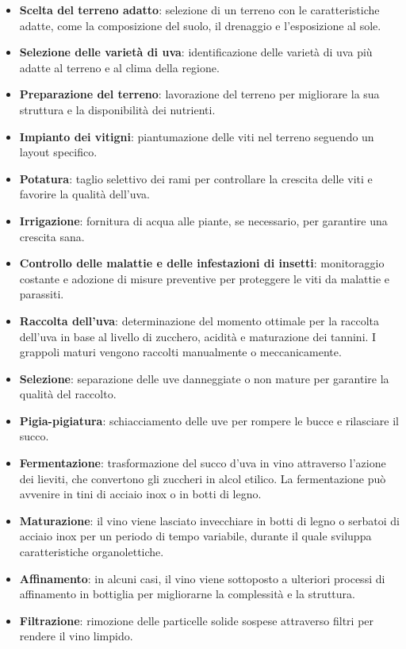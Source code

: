 \documentclass[12pt, a4paper]{article}
\begin{document}
\begin{itemize}
    \item \textbf{Scelta del terreno adatto}: selezione di un terreno con le caratteristiche adatte, come la composizione del suolo, il drenaggio e l'esposizione al sole.
    \item \textbf{Selezione delle varietà di uva}: identificazione delle varietà di uva più adatte al terreno e al clima della regione.
    \item \textbf{Preparazione del terreno}: lavorazione del terreno per migliorare la sua struttura e la disponibilità dei nutrienti.
    \item \textbf{Impianto dei vitigni}: piantumazione delle viti nel terreno seguendo un layout specifico.
    \item \textbf{Potatura}: taglio selettivo dei rami per controllare la crescita delle viti e favorire la qualità dell'uva.
    \item \textbf{Irrigazione}: fornitura di acqua alle piante, se necessario, per garantire una crescita sana.
    \item \textbf{Controllo delle malattie e delle infestazioni di insetti}: monitoraggio costante e adozione di misure preventive per proteggere le viti da malattie e parassiti.
    \item \textbf{Raccolta dell'uva}: determinazione del momento ottimale per la raccolta dell'uva in base al livello di zucchero, acidità e maturazione dei tannini. I grappoli maturi vengono raccolti manualmente o meccanicamente.
    \item \textbf{Selezione}: separazione delle uve danneggiate o non mature per garantire la qualità del raccolto.
    \item \textbf{Pigia-pigiatura}: schiacciamento delle uve per rompere le bucce e rilasciare il succo.
    \item \textbf{Fermentazione}: trasformazione del succo d'uva in vino attraverso l'azione dei lieviti, che convertono gli zuccheri in alcol etilico. La fermentazione può avvenire in tini di acciaio inox o in botti di legno.
    \item \textbf{Maturazione}: il vino viene lasciato invecchiare in botti di legno o serbatoi di acciaio inox per un periodo di tempo variabile, durante il quale sviluppa caratteristiche organolettiche.
    \item \textbf{Affinamento}: in alcuni casi, il vino viene sottoposto a ulteriori processi di affinamento in bottiglia per migliorarne la complessità e la struttura.
    \item \textbf{Filtrazione}: rimozione delle particelle solide sospese attraverso filtri per rendere il vino limpido.

\end{itemize}
\end{document}

